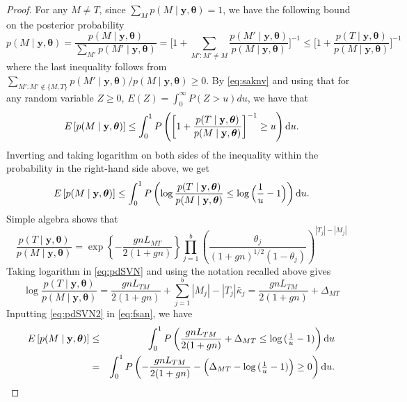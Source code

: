 \documentclass[
  12pt]{article}
\newcommand{\by}{\mathbf{y}}
\newcommand{\btheta}{\boldsymbol{\theta}}
\begin{document}
\begin{proof}
For any $M\neq T$, since $\sum_{M}p(M \mid \by, \btheta)=1$, we have the following bound on the posterior probability
\begin{equation}\label{eq:saknv}
    p(M \mid \by, \btheta)= \frac{p(M \mid \by, \btheta)} { \sum_{M'}p(M'\mid \by, \btheta)} = \bigg[1+\sum_{M':M'\neq M}\frac{p(M'\mid \by, \btheta)}{ p(M \mid \by, \btheta)}\bigg]^{-1}
\leq \bigg[1+\frac{p(T\mid \by, \btheta)}{ p(M \mid \by, \btheta)}\bigg]^{-1}
\end{equation}
where the last inequality follows from $\sum_{M':M'\notin \{M,T\}}p(M'\mid \by, \btheta)/ p(M \mid \by, \btheta) \geq 0$.
By \eqref{eq:saknv} and using that for any random variable $Z \geq 0$, $E(Z)=\int_0^\infty P(Z>u) du$, we have that
\begin{equation*}
    E \left[ p(M\mid \by, \btheta) \right] \leq \int_0^1 P\left( \bigg[1+\frac{p(T\mid \by, \btheta)}{ p(M \mid \by, \btheta)}\bigg]^{-1}\geq u\right){\rm d} u.
\end{equation*}
Inverting and taking logarithm on both sides of the inequality within the probability in the right-hand side above, we get
\begin{equation}\label{eq:fsan}
    E \left[ p(M\mid \by, \btheta) \right] \leq \int_0^1 P\left( \log \frac{p(T\mid \by, \btheta)}{ p(M \mid \by, \btheta)}\leq \log\Big(\frac 1u-1\Big)\right){\rm d} u.
\end{equation}
Simple algebra shows that
\begin{equation}\label{eq:pdSVN}
\frac{p(T \mid \by,\btheta)}{p(M \mid \by, \btheta)}=
\exp \left\{ -\frac{g n L_{MT}}{2 (1+g n)} \right\}
\prod_{j=1}^b \left( \frac{\theta_j}{(1 + gn)^{1/2} (1 - \theta_j)} \right)^{|T_j| - |M_j|}
\end{equation}
Taking logarithm in \eqref{eq:pdSVN} and using the notation recalled above gives
\begin{equation}\label{eq:pdSVN2}
    \log\frac{p(T \mid \by,\btheta)}{p(M \mid \by, \btheta)}=
\frac{g nL_{TM}}{2 (1+g n)} + \sum_{j=1}^b {|M_j| - |T_j|}\bar{\kappa}_j = 
\frac{g nL_{TM}}{2 (1+g n)}+ \Delta_{MT} 
\end{equation}
Inputting \eqref{eq:pdSVN2} in \eqref{eq:fsan}, we have
\begin{eqnarray*}
 E \left[ p(M\mid \by, \btheta) \right] &\leq&\int_0^1 P\left(\frac{g nL_{TM}}{2 (1+g n)}+ \Delta_{MT}\leq \log{(\tfrac1u-1)}\right){\rm d}u\\
  &=&\int_0^1 P\left(-\frac{g nL_{TM}}{2 (1+g n)} -  \Big(\Delta_{MT}-\log{(\tfrac1u-1)}\Big)\geq 0  \right) {\rm d}u.
\end{eqnarray*}


\end{proof}
\end{document}
